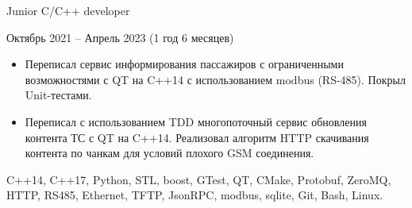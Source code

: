 {    %

    \cvexperiencePosition
        {Junior C/C++ developer}

    \cvexperiencePeriod
        {Октябрь 2021 -- Апрель 2023 (1 год 6 месяцев)}

    \smallskip
    \begin{itemize}

        \item
            Переписал сервис информирования пассажиров с ограниченными возможностями
            с QT на C++14 с использованием modbus (RS-485). Покрыл Unit-тестами.

        \item
            Переписал с использованием TDD многопоточный сервис обновления контента ТС с QT на
            C++14. Реализовал алгоритм HTTP скачивания контента по чанкам для условий плохого GSM
            соединения.

    \end{itemize}


    \funcExperienceTechnology
    {
        C++14, C++17, Python,                                           %
        STL, boost, GTest, QT,                                          %
        CMake,                                                          %
        Protobuf, ZeroMQ, HTTP, RS485, Ethernet, TFTP, JsonRPC, modbus, %
        sqlite,
        Git,                                                            %
        Bash, Linux.                                                    %
    }
}



